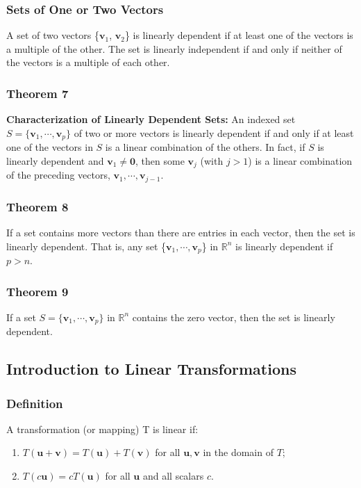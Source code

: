 \documentclass[letterpaper,11pt]{article}
\begin{document}
			\subsubsection{Sets of One or Two Vectors}
				A set of two vectors \{$\mathbf{v}_1$, $\mathbf{v}_2$\} is linearly dependent if at least one of the vectors is a multiple of the other. The set is linearly independent if and only if neither of the vectors is a multiple of each other.
			\subsubsection{Theorem 7}
				\textbf{Characterization of Linearly Dependent Sets:} An indexed set $S=\{\mathbf{v}_1, \cdots, \mathbf{v}_p\}$ of two or more vectors is linearly dependent if and only if at least one of the vectors in $S$ is a linear combination of the others. In fact, if $S$ is linearly dependent and $\mathbf{v}_1\neq\mathbf{0}$, then some $\mathbf{v}_j$ (with $j>1$) is a linear combination of the preceding vectors, $\mathbf{v}_1,\cdots,\mathbf{v}_{j-1}$.
			\subsubsection{Theorem 8}
				If a set contains more vectors than there are entries in each vector, then the set is linearly dependent. That is, any set \{$\mathbf{v}_1,\cdots,\mathbf{v}_p$\} in $\mathbb{R}^n$ is linearly dependent if $p>n$.
			\subsubsection{Theorem 9}
				If a set $S=\{\mathbf{v}_1,\cdots,\mathbf{v}_p\}$ in $\mathbb{R}^n$ contains the zero vector, then the set is linearly dependent.
		\subsection{Introduction to Linear Transformations}
			\subsubsection{Definition}
				A transformation (or mapping) T is linear if:
				\begin{enumerate}[i]
					\item $T(\mathbf{u}+\mathbf{v})=T(\mathbf{u})+T(\mathbf{v})$ for all $\mathbf{u,v}$ in the domain of $T$;
					\item $T(c\mathbf{u})=cT(\mathbf{u})$ for all $\mathbf{u}$ and all scalars $c$.
				\end{enumerate}
\end{document}
